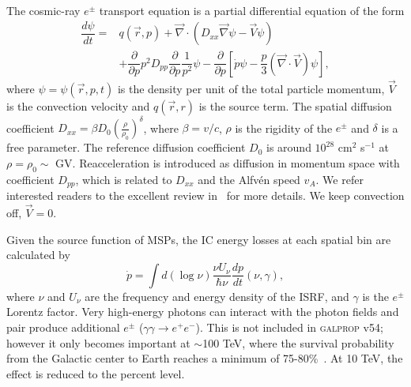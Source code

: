 \documentclass[doublespace,nopageskip]{VTthesis}
\begin{document}
The cosmic-ray $e^\pm$ transport equation is a partial differential equation of the form
\begin{align}
  \label{eq:prop_eq}
  \dfrac{d\psi}{dt} = &q(\vec{r},p)+\vec{\nabla}\cdot(D_{xx}\vec{\nabla}\psi-\vec{V}\psi)\nonumber\\
                       &+\dfrac{\partial}{\partial p}p^2D_{pp}\dfrac{\partial}{\partial p}\dfrac{1}{p^2}\psi-\dfrac{\partial}{\partial p}[\dot{p}\psi-\dfrac{p}{3}(\vec{\nabla}\cdot\vec{V})\psi],
\end{align}
where $\psi = \psi(\vec{r},p,t)$ is the density per unit of the total particle momentum, $\vec{V}$ is the convection velocity and $q(\vec{r},r)$ is the source term. The spatial diffusion coefficient $D_{xx} = \beta D_0 (\frac{\rho}{\rho_0})^\delta$, where $\beta = v/c$, $\rho$ is the rigidity of the $e^\pm$ and $\delta$ is a free parameter. The reference diffusion coefficient $D_0$ is around $10^{28}$ cm$^2$ s$^{-1}$ at $\rho = \rho_0 \sim$ GV.  Reacceleration is introduced as diffusion in momentum space with coefficient $D_{pp}$, which is related to $D_{xx}$ and the Alfv\'{e}n speed $v_A$. We refer interested readers to the excellent review in~\citet{2007ARNPS..57..285S} for more details. We keep convection off, $\vec{V}=0$.

Given the source function of MSPs, the IC energy losses at each spatial bin are calculated by
\begin{equation}
  \dot{p} = \int d(\log{\nu})\dfrac{\nu U_\nu}{\hbar \nu}\dfrac{dp}{dt}(\nu,\gamma),
\end{equation}
where $\nu$ and $U_\nu$ are the frequency and energy density of the ISRF, and $\gamma$ is the $e^\pm$ Lorentz factor. Very high-energy photons can interact with the photon fields and pair produce additional $e^\pm$ ($\gamma\gamma \to e^+e^-$). This is not included in \textsc{galprop} v54; however it only becomes important at $\sim$100 TeV, where the survival probability from the Galactic center to Earth reaches a minimum of 75-80\%~\cite{2006ApJ...640L.155M}. At 10 TeV, the effect is reduced to the percent level.
\end{document}
